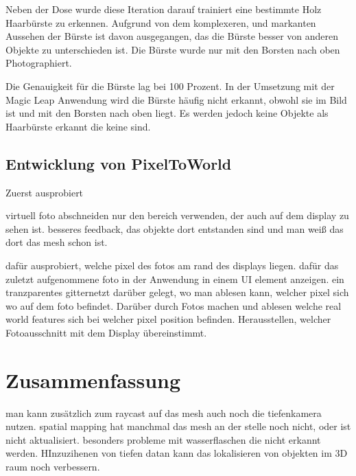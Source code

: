 \documentclass[german,a4paper, 12pt]{llncs}
\begin{document}
Neben der Dose wurde diese Iteration darauf trainiert eine bestimmte Holz Haarbürste zu erkennen. Aufgrund von dem komplexeren, und markanten Aussehen der Bürste ist davon ausgegangen, das die Bürste besser von anderen Objekte zu unterschieden ist. 
Die Bürste wurde nur mit den Borsten nach oben Photographiert.

Die Genauigkeit für die Bürste lag bei 100 Prozent. 
In der Umsetzung mit der Magic Leap Anwendung wird die Bürste häufig nicht erkannt, obwohl sie im Bild ist und mit den Borsten nach oben liegt. Es werden jedoch keine Objekte als Haarbürste erkannt die keine sind.

\subsection{Entwicklung von PixelToWorld}

Zuerst ausprobiert 

virtuell foto abschneiden nur den bereich verwenden, der auch auf dem display zu sehen ist. besseres feedback, das objekte dort entstanden sind und man weiß das dort das mesh schon ist.

dafür ausprobiert, welche pixel des fotos am rand des displays liegen. dafür das zuletzt aufgenommene foto in der Anwendung in einem UI element anzeigen. ein tranzparentes gitternetzt darüber gelegt, wo man ablesen kann, welcher pixel sich wo auf dem foto befindet. Darüber durch Fotos machen und ablesen welche real world features sich bei welcher pixel position befinden. Herausstellen, welcher Fotoausschnitt mit dem Display übereinstimmt. 

\section{Zusammenfassung}
man kann zusätzlich zum raycast auf das mesh auch noch die tiefenkamera nutzen. spatial mapping hat manchmal das mesh an der stelle noch nicht, oder ist nicht aktualisiert. besonders probleme mit wasserflaschen die nicht erkannt werden. HInzuzihenen von tiefen datan kann das lokalisieren von objekten im 3D raum noch verbessern.
	
	\newpage
	\printbibliography
\end{document}
